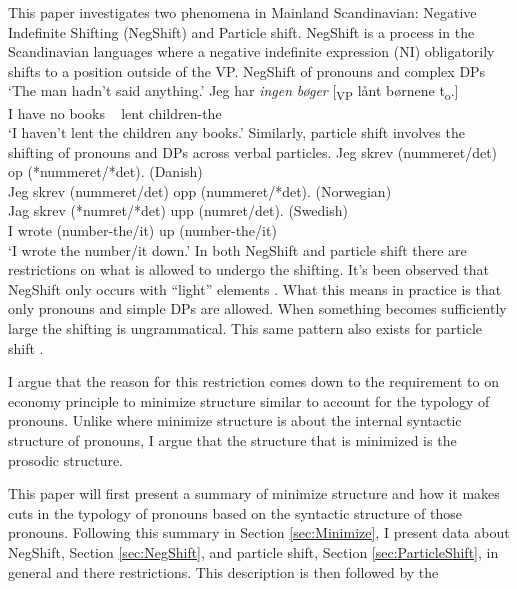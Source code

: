 \documentclass[12pt, letterpaper]{article}
\begin{document}
This paper investigates two phenomena in Mainland Scandinavian: Negative Indefinite Shifting (NegShift) and Particle shift. NegShift is a process in the Scandinavian languages where a negative indefinite expression (NI) obligatorily shifts to a position outside of the VP. 
\ea NegShift of pronouns and complex DPs\label{ex:PRIMA}
     
    \glt `The man hadn't said anything.'
    \ex 
    \gll Jeg har \textit{ingen} \textit{bøger} [\textsubscript{VP} lånt børnene t\textsubscript{o}.]\\
    I have no books ~ lent children-the\\
    \glt `I haven't lent the children any books.'
    \z
\z 
Similarly, particle shift involves the shifting of pronouns and DPs across verbal particles. 
\ea \gllll Jeg skrev (nummeret/det) op (*nummeret/*det). \hfill (Danish)\\
		Jeg skrev (nummeret/det) opp (nummeret/*det). \hfill (Norwegian)\\
		Jag skrev (*numret/*det) upp (numret/det). \hfill (Swedish)\\
		I wrote (number-the/it) up (number-the/it)\\
\glt `I wrote the number/it down.'
\z 
In both NegShift and particle shift there are restrictions on what is allowed to undergo the shifting. It's been observed that NegShift only occurs with ``light'' elements \citep{christensenInterfacesNegationSyntax2005,penkaNegativeIndefinites2011}. What this means in practice is that only pronouns and simple DPs are allowed. When something becomes sufficiently large the shifting is ungrammatical. This same pattern also exists for particle shift \citep{svenoniusOptionalityParticleShift1996,deheParticleVerbsGermanic2015,mullerDanishHeadDrivenPhraseInpreparation}.

I argue that the reason for this restriction comes down to the requirement to on economy principle to minimize structure similar to  account for the typology of pronouns. Unlike \citet{cardinalettiTypologyStructuralDeficiency1999} where minimize structure is about the internal syntactic structure of pronouns, I argue that the structure that is minimized is the prosodic structure. 

This paper will first present a summary of  minimize structure and how it makes cuts in the typology of pronouns based on the syntactic structure of those pronouns. Following this summary in Section \ref{sec:Minimize}, I present data about NegShift, Section \ref{sec:NegShift}, and particle shift, Section \ref{sec:ParticleShift}, in general and there restrictions. This description is then followed by the 
\end{document}
